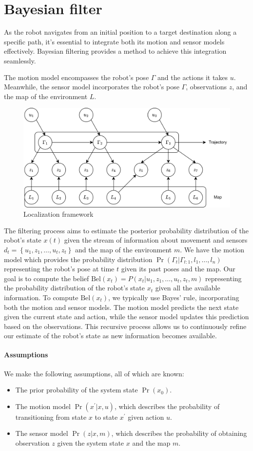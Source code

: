 \section{Bayesian filter}

As the robot navigates from an initial position to a target destination along a specific path, it's essential to integrate both its motion and sensor models effectively. 
Bayesian filtering provides a method to achieve this integration seamlessly.

The motion model encompasses the robot's pose $\Gamma$ and the actions it takes $u$. 
Meanwhile, the sensor model incorporates the robot's pose $\Gamma$, observations $z$, and the map of the environment $L$. 
\begin{figure}[H]
    \centering
    \includegraphics[width=0.75\linewidth]{images/slam.png}
    \caption{Localization framework}
\end{figure}
The filtering process aims to estimate the posterior probability distribution of the robot's state $x(t)$ given the stream of information about movement and sensors 
$d_t=\left\{u_1,z_1,\dots,u_t,z_t\right\}$ and the map of the environment $m$.
We have the motion model which provides the probability distribution $\Pr(\Gamma_t|\Gamma_{t:1},l_1,\dots,l_n)$ representing the robot's pose at time $t$ given its past poses and the map.
Our goal is to compute the belief $\text{Bel}(x_t)=P(x_t|u_1,z_1,\dots,u_t,z_t,m)$ representing the probability distribution of the robot's state $x_t$ given all the available information.
To compute $\text{Bel}(x_t)$, we typically use Bayes' rule, incorporating both the motion and sensor models. The motion model predicts the next state given the current state and action, while the sensor model updates this prediction based on the observations. This recursive process allows us to continuously refine our estimate of the robot's state as new information becomes available.

\paragraph*{Assumptions}
We make the following assumptions, all of which are known:
\begin{itemize}
    \item The prior probability of the system state $\Pr(x_0)$. 
    \item The motion model $\Pr(x^\prime|x, u)$, which describes the probability of transitioning from state $x$ to state $x^\prime$ given action $u$.
    \item The sensor model $\Pr(z|x, m)$, which describes the probability of obtaining observation $z$ given the system state $x$ and the map $m$.
\end{itemize}

